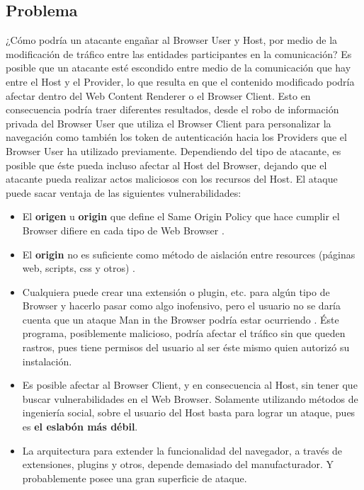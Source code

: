 \subsection{Problema}
¿Cómo podría un atacante engañar al Browser User y Host, por medio de la modificación de tráfico entre las entidades participantes en la comunicación? Es posible que un atacante esté escondido entre medio de la comunicación que hay entre el Host y el Provider, lo que resulta en que el contenido modificado podría afectar dentro del Web Content Renderer o el Browser Client. Esto en consecuencia podría traer diferentes resultados, desde el robo de información privada del Browser User que utiliza el Browser Client para personalizar la navegación como también los token de autenticación hacia los Providers que el Browser User ha utilizado previamente. Dependiendo del tipo de atacante, es posible que éste pueda incluso afectar al Host del Browser, dejando que el atacante pueda realizar actos maliciosos con los recursos del Host. 
El ataque puede sacar ventaja de las siguientes vulnerabilidades:
\begin{itemize}
	\item El \textbf{origen} u \textbf{origin} que define el Same Origin Policy que hace cumplir el Browser difiere en cada tipo de Web Browser \cite{W3C-SOP,Reis2009, Jackson2008, Crowley2010, Paola2006}.
	\item El \textbf{origin} no es suficiente como método de aislación entre resources (páginas web, scripts, css y otros) \cite{Silic2010, Barth2009, Yason, Liu2012}.
	\item Cualquiera puede crear una extensión o plugin, etc. para algún tipo de Browser y hacerlo pasar como algo inofensivo, pero el usuario no se daría cuenta que un ataque Man in the Browser podría estar ocurriendo \cite{Dougan2012,Utakrit2009,Liu2012,Barth2010}.  Éste programa, posiblemente malicioso, podría afectar el tráfico sin que queden rastros, pues tiene permisos del usuario al ser éste mismo quien autorizó su instalación.
	\item Es posible afectar al Browser Client, y en consecuencia al Host, sin tener que buscar vulnerabilidades en el Web Browser. Solamente utilizando métodos de ingeniería social, sobre el usuario del Host basta para lograr un ataque, pues es \textbf{el eslabón más débil}.
	\item La arquitectura para extender la funcionalidad del navegador, a través de extensiones, plugins y otros, depende demasiado del manufacturador. Y probablemente posee una gran superficie de ataque.
\end{itemize}

